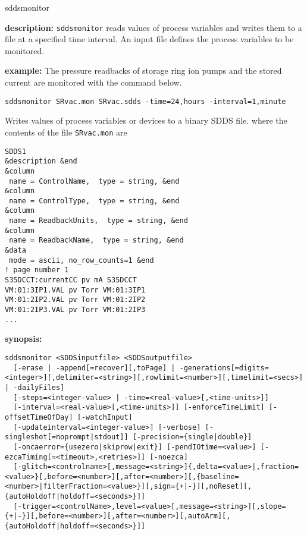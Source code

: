 %
%
\begin{sddsprog}{sddsmonitor}
\item {\bf description:}
%
%
\verb+sddsmonitor+ reads values of process variables and writes them to a file at a specified time interval.
An input file defines the process variables to be monitored.
\item {\bf example:} 
%
% 
%
The pressure readbacks of storage ring ion pumps and the stored current are monitored
with the command below.
\begin{verbatim}
sddsmonitor SRvac.mon SRvac.sdds -time=24,hours -interval=1,minute
\end{verbatim}
Writes values of process variables or devices to a binary SDDS file.
where the contents of the file \verb+SRvac.mon+ are
\begin{verbatim}
SDDS1
&description &end
&column
 name = ControlName,  type = string, &end
&column
 name = ControlType,  type = string, &end
&column
 name = ReadbackUnits,  type = string, &end
&column
 name = ReadbackName,  type = string, &end
&data
 mode = ascii, no_row_counts=1 &end
! page number 1
S35DCCT:currentCC pv mA S35DCCT
VM:01:3IP1.VAL pv Torr VM:01:3IP1
VM:01:2IP2.VAL pv Torr VM:01:2IP2 
VM:01:2IP3.VAL pv Torr VM:01:2IP3 
...
\end{verbatim}
\item {\bf synopsis:} 
%
%
\begin{verbatim}
sddsmonitor <SDDSinputfile> <SDDSoutputfile>
  [-erase | -append[=recover][,toPage] | -generations[=digits=<integer>][,delimiter=<string>][,rowlimit=<number>][,timelimit=<secs>] | -dailyFiles]
  [-steps=<integer-value> | -time=<real-value>[,<time-units>]]
  [-interval=<real-value>[,<time-units>]] [-enforceTimeLimit] [-offsetTimeOfDay] [-watchInput]
  [-updateinterval=<integer-value>] [-verbose] [-singleshot[=noprompt|stdout]] [-precision={single|double}]
  [-oncaerror={usezero|skiprow|exit}] [-pendIOtime=<value>] [-ezcaTiming[=<timeout>,<retries>]] [-noezca]
  [-glitch=<controlname>[,message=<string>]{,delta=<value>|,fraction=<value>}[,before=<number>][,after=<number>][,{baseline=<number>|filterFraction=<value>}][,sign={+|-}][,noReset][,{autoHoldoff|holdoff=<seconds>}]]
  [-trigger=<controlName>,level=<value>[,message=<string>][,slope={+|-}][,before=<number>][,after=<number>][,autoArm][,{autoHoldoff|holdoff=<seconds>}]]

\end{verbatim}
\end{sddsprog}

